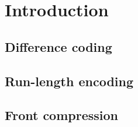 \chapter{Introduction}

\section{Difference coding}

\section{Run-length encoding}

\section{Front compression}

